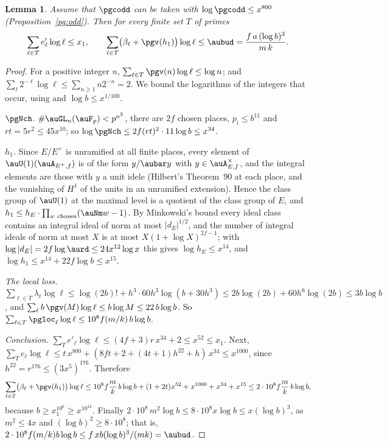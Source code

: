 \documentclass[10pt]{amsart}
\newtheorem{lemma}[theorem]{Lemma}
\theoremstyle{definition}
\theoremstyle{remark}
\begin{document}
\begin{lemma}\label{pg:sums}
Assume that $\pgcodd$ can be taken with $\log\pgcodd\le x^{800}$ (Proposition~\ref{pg:odd}). Then
for every finite set $T$ of primes
\[
\sum_{\ell\in T}e'_\ell\log\ell\le x_1,\qquad
\sum_{\ell\in T}\bigl(\beta_\ell+\pgv(h_1)\bigr)\log\ell\le\aubud=\frac{f\,a\,(\log b)^3}{m\,k}.
\]
\end{lemma}
\begin{proof}
For a positive integer $n$, $\sum_{\ell\in T}\pgv(n)\log\ell\le\log n$; and
$\sum_\ell2^{-\ell}\log\ell\le\sum_{n\ge1}n2^{-n}=2$. We bound the logarithms of the integers that
occur, using {\cite[(36) and~(38)]{P46}} and $\log b\le x^{1/100}$.

\emph{$\pgNch$.} $\#\auGL_n(\auF_p)<p^{n^2}$, there are $2f$ chosen places, $p_i\le b^{11}$ and
$rt=5r^2\le45x^{10}$; so $\log\pgNch\le2f(rt)^2\cdot11\log b\le x^{34}$.

\emph{$h_1$.} Since $E/E^+$ is unramified at all finite places, every element of
$\auU(1)(\auA_{E^+,f})$ is of the form $y/\aubar y$ with $y\in\auA_{E,f}^\times$, and the integral
elements are those with $y$ a unit idele (Hilbert's Theorem~90 at each place, and the vanishing of
$H^1$ of the units in an unramified extension). Hence the class group of $\auU(1)$ at the maximal
level is a quotient of the class group of $E$, and $h_1\le h_E\cdot\prod_{w\text{ chosen}}
(\auNm w-1)$. By Minkowski's bound every ideal class contains an integral ideal of norm at most
$|d_E|^{1/2}$, and the number of integral ideals of norm at most $X$ is at most
$X(1+\log X)^{2f-1}$; with $\log|d_E|=2f\log\aurd\le24x^{12}\log x$ this gives $\log h_E\le
x^{14}$, and $\log h_1\le x^{14}+22f\log b\le x^{15}$.

\emph{The local loss.} $\sum_{\ell\in T}\lambda_\ell\log\ell\le\log(2b)!+h^3\cdot60h^3\log(b+30h^3)
\le2b\log(2b)+60h^6\log(2b)\le3b\log b$, and $\sum_\ell b\,\pgv(M)\log\ell\le b\log M\le22\,b\log
b$. So $\sum_{\ell\in T}\pgloc_\ell\log\ell\le10^8f(m/k)\,b\log b$.

\emph{Conclusion.} $\sum_T e'_\ell\log\ell\le(4f+3)r\,x^{34}+2\le x^{52}\le x_1$. Next,
$\sum_Te_\ell\log\ell\le t\,x^{800}+(8ft+2+(4t+1)h^{22}+h)\,x^{34}\le x^{1000}$, since
$h^{22}=r^{176}\le(3x^5)^{176}$. Therefore
\[
\sum_{\ell\in T}\bigl(\beta_\ell+\pgv(h_1)\bigr)\log\ell\le10^8f\frac mk\,b\log b+(1+2t)x^{52}
+x^{1000}+x^{34}+x^{15}\le2\cdot10^8f\frac mk\,b\log b,
\]
because $b\ge x_1^{10^6}\ge x^{10^{12}}$. Finally $2\cdot10^8\,m^2\log b\le8\cdot10^8x\log b\le
x(\log b)^3$, as $m^2\le4x$ and $(\log b)^2\ge8\cdot10^8$; that is,
$2\cdot10^8f(m/k)b\log b\le f\,xb(\log b)^3/(mk)=\aubud$.
\end{proof}
\end{document}
